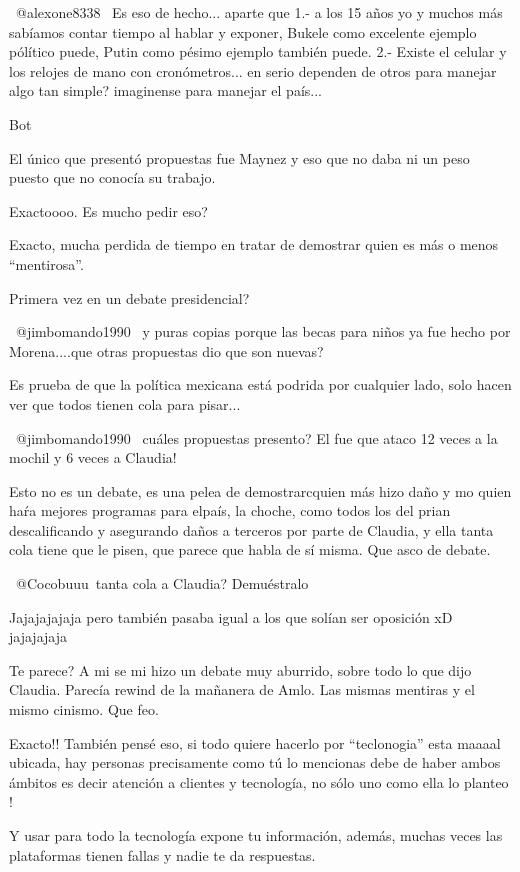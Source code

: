 ​ @alexone8338  Es eso de hecho...  aparte que 1.- a los 15 años yo y muchos más sabíamos contar tiempo al hablar y exponer, Bukele como excelente ejemplo pólítico puede, Putin como pésimo ejemplo también puede. 2.- Existe el celular y los relojes de mano con cronómetros... en serio dependen de otros para manejar algo tan simple? imaginense para manejar el país...

Bot

El único que presentó propuestas fue Maynez y eso que no daba ni un peso puesto que no conocía su trabajo.

Exactoooo. Es mucho pedir eso?

Exacto, mucha perdida de tiempo en tratar de demostrar quien es más o menos “mentirosa”.

Primera vez en un debate presidencial?

​ @jimbomando1990   y puras copias porque las becas para niños ya fue hecho por Morena....que otras propuestas dio que son nuevas?

Es prueba de que la política mexicana está podrida por cualquier lado, solo hacen ver que todos tienen cola para pisar...

​​ @jimbomando1990  cuáles propuestas presento? El fue que ataco 12 veces a la mochil y 6 veces a Claudia!🤷🏻‍♀️🤷🏻‍♀️

Esto no es un debate, es una pelea de demostrarcquien más hizo daño y mo quien haŕa mejores programas para elpaís, la choche, como todos los del prian descalificando y asegurando daños a terceros por parte de Claudia, y ella tanta cola tiene que le pisen, que parece que habla de sí misma. Que asco de debate.

 @Cocobuuu tanta cola a Claudia? Demuéstralo

Jajajajajaja pero también pasaba igual a los que solían ser oposición xD jajajajaja

Te parece?
A mi se mi hizo un  debate muy aburrido, sobre todo lo que  dijo Claudia. 
Parecía rewind de la  mañanera de Amlo.
Las mismas mentiras y el mismo cinismo. 
Que  feo.

Exacto!! También pensé eso, si todo quiere hacerlo por “teclonogia” esta maaaal ubicada, hay personas precisamente como tú lo mencionas debe de haber ambos ámbitos es decir atención a clientes y tecnología, no sólo uno como ella lo planteo !

Y usar para todo la tecnología expone tu información, además, muchas veces las plataformas tienen fallas y nadie te da respuestas.

